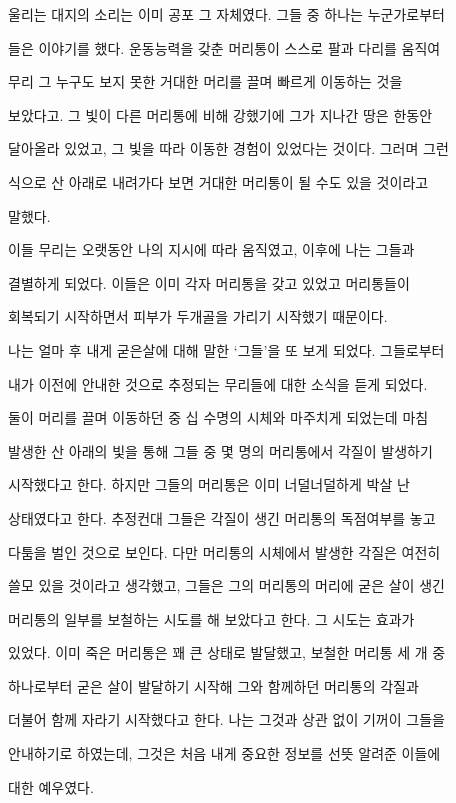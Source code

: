 울리는 대지의 소리는 이미 공포 그 자체였다. 그들 중 하나는 누군가로부터

들은 이야기를 했다. 운동능력을 갖춘 머리통이 스스로 팔과 다리를 움직여

무리 그 누구도 보지 못한 거대한 머리를 끌며 빠르게 이동하는 것을

보았다고. 그 빛이 다른 머리통에 비해 강했기에 그가 지나간 땅은 한동안

달아올라 있었고, 그 빛을 따라 이동한 경험이 있었다는 것이다. 그러며 그런

식으로 산 아래로 내려가다 보면 거대한 머리통이 될 수도 있을 것이라고

말했다.



이들 무리는 오랫동안 나의 지시에 따라 움직였고, 이후에 나는 그들과

결별하게 되었다. 이들은 이미 각자 머리통을 갖고 있었고 머리통들이

회복되기 시작하면서 피부가 두개골을 가리기 시작했기 때문이다.



나는 얼마 후 내게 굳은살에 대해 말한 `그들'을 또 보게 되었다. 그들로부터

내가 이전에 안내한 것으로 추정되는 무리들에 대한 소식을 듣게 되었다.

둘이 머리를 끌며 이동하던 중 십 수명의 시체와 마주치게 되었는데 마침

발생한 산 아래의 빛을 통해 그들 중 몇 명의 머리통에서 각질이 발생하기

시작했다고 한다. 하지만 그들의 머리통은 이미 너덜너덜하게 박살 난

상태였다고 한다. 추정컨대 그들은 각질이 생긴 머리통의 독점여부를 놓고

다툼을 벌인 것으로 보인다. 다만 머리통의 시체에서 발생한 각질은 여전히

쓸모 있을 것이라고 생각했고, 그들은 그의 머리통의 머리에 굳은 살이 생긴

머리통의 일부를 보철하는 시도를 해 보았다고 한다. 그 시도는 효과가

있었다. 이미 죽은 머리통은 꽤 큰 상태로 발달했고, 보철한 머리통 세 개 중

하나로부터 굳은 살이 발달하기 시작해 그와 함께하던 머리통의 각질과

더불어 함께 자라기 시작했다고 한다. 나는 그것과 상관 없이 기꺼이 그들을

안내하기로 하였는데, 그것은 처음 내게 중요한 정보를 선뜻 알려준 이들에

대한 예우였다.




